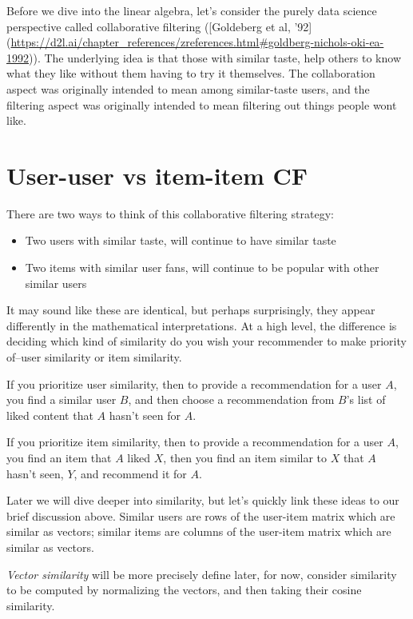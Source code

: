 Before we dive into the linear algebra, let's consider the purely data science perspective called collaborative filtering ([Goldeberg et al, '92](\url{https://d2l.ai/chapter_references/zreferences.html#goldberg-nichols-oki-ea-1992})). The underlying idea is that those with similar taste, help others to know what they like without them having to try it themselves. The collaboration aspect was originally intended to mean among similar-taste users, and the filtering aspect was originally intended to mean filtering out things people wont like.

\section{User-user vs item-item CF}

There are two ways to think of this collaborative filtering strategy:
\begin{itemize}
    \item Two users with similar taste, will continue to have similar taste
    \item Two items with similar user fans, will continue to be popular with other similar users
\end{itemize}

It may sound like these are identical, but perhaps surprisingly, they appear differently in the mathematical interpretations. At a high level, the difference is deciding which kind of similarity do you wish your recommender to make priority of–user similarity or item similarity.

If you prioritize user similarity, then to provide a recommendation for a user $A$, you find a similar user $B$, and then choose a recommendation from $B$'s list of liked content that $A$ hasn't seen  for $A$. 

If you prioritize item similarity, then to provide a recommendation for a user $A$, you find an item that $A$ liked $X$, then you find an item similar to $X$ that $A$ hasn't seen, $Y$, and recommend it for $A$.

Later we will dive deeper into similarity, but let's quickly link these ideas to our brief discussion above. Similar users are rows of the user-item matrix which are similar as vectors; similar items are columns of the user-item matrix which are similar as vectors.


\vspace{10pt}
\colorbox{almond}{\parbox{\textwidth}{
 \emph{Vector similarity} will be more precisely define later, for now, consider similarity to be computed by normalizing the vectors, and then taking their cosine similarity.
}}
\vspace{10pt}


